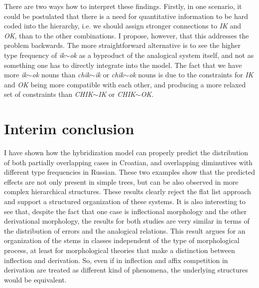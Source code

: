 There are two ways how to interpret these findings. Firstly, in one scenario, it could be postulated that there is a need for quantitative information to be hard coded into the hierarchy, i.e. we should assign stronger connections to \textit{IK} and \textit{OK}, than to the other combinations. I propose, however, that this addresses the problem backwards. The more straightforward alternative is to see the higher type frequency of \textit{ik$\sim$ok} as a byproduct of the analogical system itself, and not as something one has to directly integrate into the model. The fact that we have more \textit{ik$\sim$ok} nouns than \textit{chik$\sim$ik} or \textit{chik$\sim$ok} nouns is due to the  constraints for \textit{IK} and \textit{OK} being more compatible with each other, and producing a more relaxed set of constraints than \textit{CHIK$\sim$IK} or \textit{CHIK$\sim$OK}.


\section{Interim conclusion}

I have shown how the hybridization model can properly predict the distribution of both partially overlapping cases in Croatian, and overlapping diminutives with different type frequencies in Russian. These two examples show that the predicted effects are not only present in simple trees, but can be also observed in more complex hierarchical structures. These results clearly reject the flat list approach and support a structured organization of these systems. It is also interesting to see that, despite the fact that one case is inflectional morphology and the other derivational morphology, the results for both studies are very similar in terms of the distribution of errors and the analogical relations. This result argues for an organization of the  stems in classes independent of the type of morphological process, at least for morphological theories that make a distinction between inflection and derivation. So, even if  in inflection and affix competition in derivation are treated as different kind of phenomena, the underlying structures would be equivalent.

